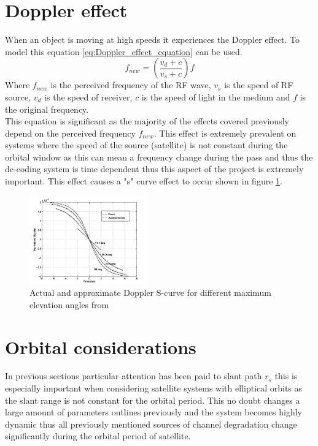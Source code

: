 \documentclass[conference]{IEEEtran}
\begin{document}
\label{sec:Noise_temp}


\section{Doppler effect}
When an object is moving at high speeds it experiences the Doppler effect. To model this equation \ref{eq:Doppler_effect_equation} can be used. 
\begin{equation}
f_{new} =(\frac{v_d+c}{v_s+c})f
\label{eq:Doppler_effect_equation}
\end{equation}
Where $f_{new}$ is the perceived frequency of the RF wave, $v_s$ is the speed of RF source, $v_d$ is the speed of receiver, $c$ is the speed of light in the medium and $f$ is the original frequency.\\

This equation is significant as the majority of the effects covered previously depend on the perceived frequency $f_{new}$. This effect is extremely prevalent on systems where the speed of the source (satellite) is not constant during the orbital window as this can mean a frequency change during the pass and thus the de-coding system is time dependent thus this aspect of the project is extremely important. This effect causes a "s" curve effect to occur shown in figure \ref{fig:Doppler}.

\begin{figure}[h]
\centering
	\includegraphics[width = 0.45\textwidth]{Doppler_s_curve.png}
	\caption{Actual and approximate Doppler S-curve for different maximum elevation angles from \cite{doppler_effect}}
	\label{fig:Doppler}
\end{figure}

\label{sec:Doppler}

\section{Orbital considerations}
In previous sections particular attention has been paid to slant path $r_s$ this is especially important when considering satellite systems with elliptical orbits as the slant range is not constant for the orbital period. This no doubt changes a large amount of parameters outlines previously and the system becomes highly dynamic thus all previously mentioned sources of channel degradation change significantly during the orbital period of satellite.\\
\end{document}
